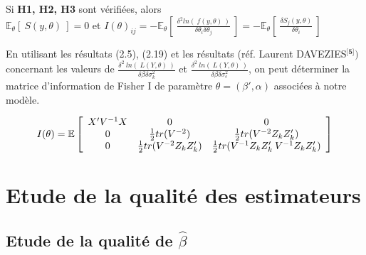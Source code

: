 \documentclass[12pt,fleqn]{book} %
\begin{document}
\vspace{2em}

\begin{theorem} Si \textbf{H1, H2, H3} sont vérifiées, alors \\

 $\mathbb{E}_\theta\left[\:S(y,\theta) \:\right]=0 $ \:et\: $ I(\theta)_{ij}=-\mathbb{E}_\theta\left[\: \frac{\delta^2 ln(\:f(y,\theta)\:)}{\delta \theta_i \delta\theta_j} \:\right]=-\mathbb{E}_\theta\left[\:\frac{\delta  S_j(y,\theta)}{\delta\theta_i}\:\right]$
 \end{theorem}

\vspace{4em}

En utilisant les résultats (2.5), (2.19) et les résultats (réf. Laurent DAVEZIES$^\textbf{[5]})$ concernant les valeurs de $\frac{\delta^2\: ln( \:\textit{L}(Y,\theta)\:)}{\delta \beta \delta \sigma_k^2 }$ et $\frac{\delta^2\: ln( \:\textit{L}(Y,\theta)\:)}{\delta \beta \delta \sigma_{\epsilon}^2 }$, on peut déterminer la matrice d'information de Fisher I de paramètre $\theta=(\beta',\alpha)$  associées à notre modèle.
 
 \[
 I(\theta)=\mathbb{E}\left[
  \begin{array}{ c c c}
  X'V^{-1}X & 0 & 0  \\
  0 & \frac{1}{2}tr(V^{-2}) & \frac{1}{2}tr(V^{-2} Z_k Z_k') \\
  0 & \frac{1}{2}tr(V^{-2} Z_k Z_k') & \frac{1}{2}tr(V^{-1} Z_k Z_k'\:V^{-1} Z_k Z_k')
  \end{array} \right]
  \]
  

\newpage

\section{Etude de la qualité des estimateurs}

\vspace{1em}

\subsection{Etude de la qualité de $\hat{\beta}$}
\end{document}
